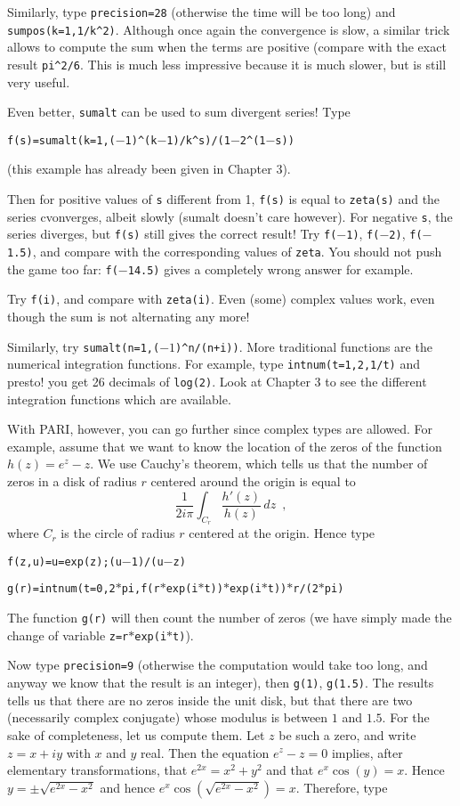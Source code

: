 Similarly, type {\tt\bs precision=28} (otherwise the time will be too long)
and {\tt sumpos(k=1,1/k\^{}2)}. Although once again the convergence is
slow, a similar trick allows to compute the sum when the terms are positive
(compare with the exact result {\tt pi\^{}2/6}. This is much less impressive
because it is much slower, but is still very useful.

Even better, {\tt sumalt} can be used to sum divergent series! Type

\centerline{\tt f(s)=sumalt(k=1,($-$1)\^{}(k$-$1)/k\^{}s)/(1$-$2\^{}(1$-$s))}

(this example has already been given in Chapter 3).

Then for positive values of {\tt s} different from 1, {\tt f(s)} is equal
to {\tt zeta(s)} and the series cvonverges, albeit slowly (sumalt doesn't
care however). For negative {\tt s}, the series diverges, but {\tt f(s)}
still gives the correct result! Try {\tt f($-$1)}, {\tt f($-$2)}, {\tt f($-$1.5)},
and compare with the corresponding values of {\tt zeta}.
You should not push the game too far: {\tt f($-$14.5)} gives a completely
wrong answer for example.

Try {\tt f(i)}, and compare with {\tt zeta(i)}. Even (some) complex values 
work, even though the sum is not alternating any more!

Similarly, try {\tt sumalt(n=1,($-1$)\^{}n/(n+i))}.
\medskip
More traditional functions are the numerical integration functions.
For example, type {\tt intnum(t=1,2,1/t)} and presto! you get 26 decimals
of {\tt log(2)}. Look at Chapter 3 to see the different integration functions
which are available.

With PARI, however, you can go further since complex types are allowed.
For example, assume that we want to know the location of the zeros of the
function $h(z)=e^z-z$. We use Cauchy's theorem, which tells us that the
number of zeros in a disk of radius $r$ centered around the origin is
equal to
$$\dfrac{1}{2i\pi}\int_{C_r}\dfrac{h'(z)}{h(z)}\,dz\enspace,$$
where $C_r$ is the circle of radius $r$ centered at the origin.
Hence type 

\centerline{\tt f(z,u)=u=exp(z);(u$-$1)/(u$-$z)}

\centerline{\tt g(r)=intnum(t=0,2$*$pi,f(r$*$exp(i$*$t))$*$exp(i$*$t))$*$r/(2$*$pi)}

The function {\tt g(r)} will then count the number of zeros (we have simply
made the change of variable {\tt z=r$*$exp(i$*$t)}).

Now type {\tt\bs precision=9} (otherwise the computation would take too long,
and anyway we know that the result is an integer), then {\tt g(1)},
{\tt g(1.5)}. The results tells us that there are no zeros inside the unit
disk, but that there are two (necessarily complex conjugate) whose modulus
is between $1$ and $1.5$. For the sake of completeness, let us compute them.
Let $z$ be such a zero, and write $z=x+iy$ with $x$ and $y$ real. Then
the equation $e^z-z=0$ implies, after elementary transformations, that
$e^{2x}=x^2+y^2$ and that $e^x\cos(y)=x$. Hence $y=\pm\sqrt{e^{2x}-x^2}$
and hence $e^x\cos(\sqrt{e^{2x}-x^2})=x$. Therefore, type


